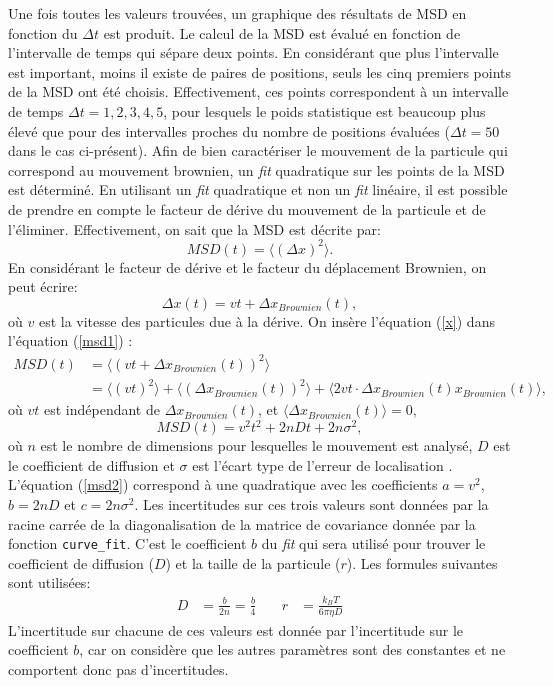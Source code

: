\documentclass[11pt,letterpaper]{article}
\begin{document}
Une fois toutes les valeurs trouvées, un graphique des résultats de MSD en fonction du $\Delta t$ est produit. Le calcul de la MSD est évalué en fonction de l'intervalle de temps
qui sépare deux points. En considérant que plus l'intervalle est important, moins il existe de paires de positions, seuls les cinq premiers points de
la MSD ont été choisis. Effectivement, ces points correspondent à un intervalle de temps $\Delta t=1,2,3,4,5$, pour lesquels le poids statistique est beaucoup plus élevé
que pour des intervalles proches du nombre de positions évaluées ($\Delta t=50$ dans le cas ci-présent).
Afin de bien caractériser le mouvement de la particule
qui correspond au mouvement brownien, un \textit{fit} quadratique sur les points de la MSD est déterminé. 
En utilisant un \textit{fit} quadratique et non un \textit{fit} linéaire,
il est possible de prendre en compte le facteur de dérive du mouvement de la particule et de l'éliminer. Effectivement, on sait que la MSD est décrite par:
\begin{equation}\label{msd1}
  MSD(t)=\langle\left(\Delta x \right)^2\rangle.
\end{equation} 
En considérant le facteur de dérive et le facteur du déplacement Brownien, on peut écrire:
\begin{equation}\label{x}
  \Delta x (t)=vt+\Delta x_{Brownien}(t),
\end{equation} 
où $v$ est la vitesse des particules due à la dérive. On insère l'équation (\ref{x}) dans l'équation (\ref{msd1}) :
\begin{align*}
  MSD(t)&=\langle\left(vt+\Delta x_{Brownien}(t) \right)^2\rangle\\
  &=\langle\left(vt\right)^2\rangle+\langle\left(\Delta x_{Brownien}(t)\right)^2\rangle+\langle2vt\cdot \Delta x_{Brownien}(t)x_{Brownien}(t)\rangle,
\end{align*}
où $vt$ est indépendant de $\Delta x_{Brownien}(t)$, et $\langle\Delta x_{Brownien}(t)\rangle=0$,
\begin{equation}\label{msd2}
  MSD(t)=v^2t^2+2nDt+2n\sigma^2,
\end{equation}
où $n$ est le nombre de dimensions pour lesquelles le mouvement est analysé, $D$ est le coefficient de diffusion et $\sigma$ est l'écart type
de l'erreur de localisation \cite{weiss_mandat_2024}. L'équation (\ref{msd2}) correspond à une quadratique avec
les coefficients $a=v^2$, $b=2nD$ et $c=2n\sigma^2$. Les incertitudes sur ces trois valeurs sont données par la racine carrée 
de la diagonalisation de la matrice de covariance donnée par la fonction \texttt{curve\_fit}. 
C'est le coefficient $b$ du \textit{fit} qui sera utilisé pour trouver le coefficient de diffusion ($D$) et la taille de la particule ($r$). Les formules suivantes sont utilisées: 
\begin{align*}
  D &= \frac{b}{2n}=\frac{b}{4} \quad & r &= \frac{k_B T}{6 \pi \eta D}
\end{align*}
L'incertitude sur chacune de ces valeurs est donnée par l'incertitude sur le coefficient $b$, car on considère que les autres paramètres sont des constantes
et ne comportent donc pas d'incertitudes. 
\end{document}
